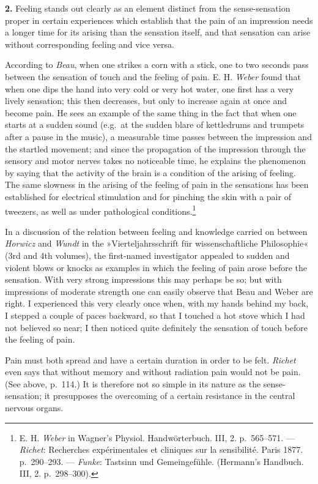 \documentclass[12pt,a4paper]{book}
\newcommand{\opage}[1]{\marginnote{\footnotesize\textit{[#1]}}}
\begin{document}
\textbf{2.} Feeling stands out clearly as an element distinct from the
sense-sensation proper in certain experiences which establish that the
pain of an impression needs a longer time for
\opage{270}its arising than the sensation itself, and that sensation can
arise without corresponding feeling and vice versa.

According to \emph{Beau}, when one strikes a corn with a stick, one to
two seconds pass between the sensation of touch and the feeling of pain.
E. H. \emph{Weber} found that when one dips the hand into very cold or
very hot water, one first has a very lively sensation; this then
decreases, but only to increase again at once and become pain. He sees
an example of the same thing in the fact that when one starts at a
sudden sound (e.g.\ at the sudden blare of kettledrums and trumpets
after a pause in the music), a measurable time passes between the
impression and the startled movement; and since the propagation of the
impression through the sensory and motor nerves takes no noticeable
time, he explains the phenomenon by saying that the activity of the
brain is a condition of the arising of feeling. The same slowness in the
arising of the feeling of pain in the sensations has been established
for electrical stimulation and for pinching the skin with a pair of
tweezers, as well as under pathological
conditions.\footnote{E. H. \emph{Weber} in Wagner's Physiol.
Handwörterbuch. III, 2. p.~565--571. --- \emph{Richet}: Recherches
expérimentales et cliniques sur la sensibilité. Paris 1877. p.~290--293.
--- \emph{Funke}: Tastsinn und Gemeingefühle. (Hermann's Handbuch. III,
2. p.~298--300).}

In a discussion of the relation between feeling and knowledge carried
on between \emph{Horwicz} and \emph{Wundt} in the »Vierteljahrsschrift
für wissenschaftliche Philosophie« (3rd and 4th volumes), the
first-named investigator appealed to sudden and violent blows or knocks
as examples in which the feeling of pain arose before the sensation.
With very strong impressions this may perhaps be so; but with
impressions of moderate strength one can easily observe that Beau and
Weber are right. I experienced this very clearly once when, with my
hands behind my back, I stepped a couple of paces backward, so that I
touched a hot stove which I had not believed so near; I then noticed
quite definitely the sensation of touch before the feeling of pain.

Pain must both spread and have a certain duration in order to be felt.
\emph{Richet} even says that without memory and
\opage{271}without radiation pain would not be pain. (See above,
p.~114.) It is therefore not so simple in its nature as the
sense-sensation; it presupposes the overcoming of a certain resistance
in the central nervous organs.
\end{document}
